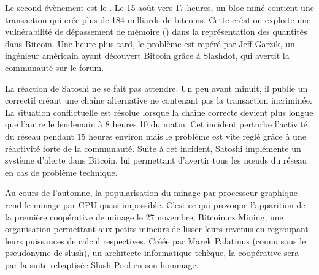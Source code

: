 Le second évènement est le . Le 15 août vers 17 heures, un bloc miné contient une transaction qui crée plus de 184 milliards de bitcoins. Cette création exploite une vulnérabilité de dépassement de mémoire () dans la représentation des quantités dans Bitcoin. Une heure plus tard, le problème est repéré par Jeff Garzik, un ingénieur américain ayant découvert Bitcoin grâce à Slashdot, qui avertit la communauté sur le forum.


La réaction de Satoshi ne se fait pas attendre. Un peu avant minuit, il publie un correctif créant une chaîne alternative ne contenant pas la transaction incriminée. La situation conflictuelle est résolue lorsque la chaîne correcte devient plus longue que l'autre le lendemain à 8 heures 10 du matin. Cet incident perturbe l'activité du réseau pendant 15 heures environ mais le problème est vite réglé grâce à une réactivité forte de la communauté. Suite à cet incident, Satoshi implémente un système d'alerte dans Bitcoin, lui permettant d'avertir tous les nœuds du réseau en cas de problème technique.

Au cours de l'automne, la popularisation du minage par processeur graphique rend le minage par CPU quasi impossible. C'est ce qui provoque l'apparition de la première coopérative de minage le 27 novembre, Bitcoin.cz Mining, une organisation permettant aux petits mineurs de lisser leurs revenus en regroupant leurs puissances de calcul respectives. Créée par Marek Palatinus (connu sous le pseudonyme de slush), un architecte informatique tchèque, la coopérative sera par la suite rebaptisée Slush Pool en son hommage.

